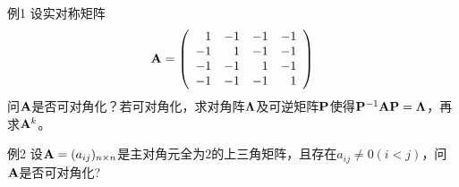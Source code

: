 \begin{frame}
  \begin{footnotesize}
    \begin{exampleblock}{例1}
      设实对称矩阵
      $$
      \mathbf{A}=\left(
      \begin{array}{rrrr}
        1&-1&-1&-1\\
        -1&1&-1&-1\\
        -1&-1&1&-1\\
        -1&-1&-1&1
      \end{array}
      \right)
      $$
      问$\mathbf{A}$是否可对角化？若可对角化，求对角阵$\mathbf{\Lambda}$及可逆矩阵$\mathbf{P}$使得$\mathbf{P}^{-1}\mathbf{A}\mathbf{P}=\mathbf{\Lambda}$，再求$\mathbf{A}^k$。
    \end{exampleblock}
  \end{footnotesize}
\end{frame}

\begin{frame}
  \begin{footnotesize}
    \begin{exampleblock}{例2}
      设$\mathbf{A}=(a_{ij})_{n\times n}$是主对角元全为$2$的上三角矩阵，且存在$a_{ij}\ne 0(i<j)$，问$\mathbf{A}$是否可对角化?
    \end{exampleblock}
  \end{footnotesize}
\end{frame}
